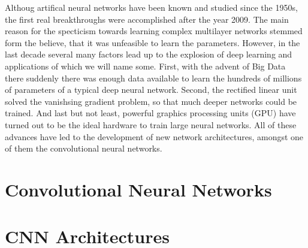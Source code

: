 Althoug artifical neural networks have been known and studied since the 1950s, the first real breakthroughs were accomplished after the year 2009. The main reason for the specticism towards learning complex multilayer networks stemmed form the believe, that it was unfeasible to learn the parameters. However, in the last decade several many factors lead up to the explosion of deep learning and applications of which we will name some. First, with the advent of Big Data there suddenly there was enough data available to learn the hundreds of millions of parameters of a typical deep neural network. Second, the rectified linear unit solved the vanishsing gradient problem, so that much deeper networks could be trained. And last but not least, powerful graphics processing units (GPU) have turned out to be the ideal hardware to train large neural networks. All of these advances have led to the development of new network architectures, amongst one of them the convolutional neural networks.

\section{Convolutional Neural Networks}


\section{CNN Architectures}